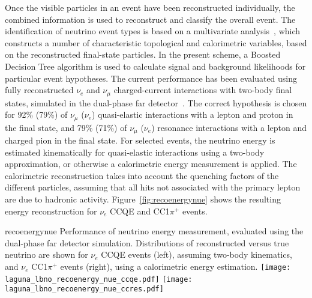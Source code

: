 Once the visible particles in an event have been reconstructed
individually, the combined information is used to reconstruct and
classify the overall event.  The identification of neutrino event
types is based on a multivariate
analysis~\cite{Back:2013cva,WA105_TDR,LAGUNA-LBNO-deliv,LAGUNA-LBNO-EOI},
which constructs a number of characteristic topological and
calorimetric variables, based on the reconstructed final-state
particles. In the present scheme, a Boosted Decision Tree algorithm is
used to calculate signal and background likelihoods for particular
event hypotheses. The current performance has been evaluated using
fully reconstructed $\nu_{e}$ and $\nu_{\mu}$ charged-current
interactions with two-body final states, simulated in the dual-phase
far detector~\cite{LAGUNA-LBNO-deliv}.  The correct hypothesis is
chosen for 92\% (79\%) of $\nu_{\mu}$ ($\nu_{e}$) quasi-elastic
interactions with a lepton and proton in the final state, and 79\%
(71\%) of $\nu_{\mu}$ ($\nu_{e}$) resonance interactions with a lepton
and charged pion in the final state.  For selected events, the
neutrino energy is estimated kinematically for quasi-elastic
interactions using a two-body approximation, or otherwise a
calorimetric energy measurement is applied.  The calorimetric
reconstruction takes into account the quenching factors of the
different particles, assuming that all hits not associated with the
primary lepton are due to hadronic activity.
Figure~\ref{fig:recoenergynue} shows the resulting energy
reconstruction for $\nu_e$ CCQE and CC1$\pi^{+}$ events.

\begin{cdrfigure}{recoenergynue}
{Performance of neutrino energy measurement, evaluated using the dual-phase far detector simulation. 
Distributions of reconstructed versus true neutrino are shown for $\nu_{e}$ CCQE events (left),
assuming two-body kinematics, and $\nu_{e}$  CC1$\pi^{+}$ events (right),
using a calorimetric energy estimation.}
\texttt{[image: laguna\_lbno\_recoenergy\_nue\_ccqe.pdf]}
\texttt{[image: laguna\_lbno\_recoenergy\_nue\_ccres.pdf]}
\end{cdrfigure}


